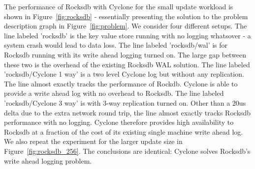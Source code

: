 \documentclass[pageno]{jpaper}
\begin{document}
The performance of Rocksdb with Cyclone for the small update workload is shown
in Figure~\ref{fig:rocksdb} - essentially presenting the solution to the problem
description graph in Figure~\ref{fig:problem}.  We consider four different
setups. The line labeled 'rocksdb' is the key value store running with no
logging whatsover - a system crash would lead to data loss. The line labeled
'rocksdb/wal' is for Rocksdb running with its write ahead logging turned on. The
large gap between these two is the overhead of the existing Rocksdb WAL
solution. The line labeled 'rocksdb/Cyclone 1 way' is a two level Cyclone log
but without any replication. The line almost exactly tracks the performance of
Rockdb. Cyclone is able to provide a write ahead log with no overhead to
Rocksdb. The line labeled 'rocksdb/Cyclone 3 way' is with 3-way replication
turned on. Other than a 20us delta due to the extra network round trip, the line
almost exactly tracks Rocksdb performance with no logging. Cyclone therefore
provides high availability to Rocksdb at a fraction of the cost of its existing
single machine write ahead log. We also repeat the experiment for the larger
update size in Figure~\ref{fig:rocksdb_256}. The conclusions are identical:
Cyclone solves Rocksdb's write ahead logging problem.
\end{document}
